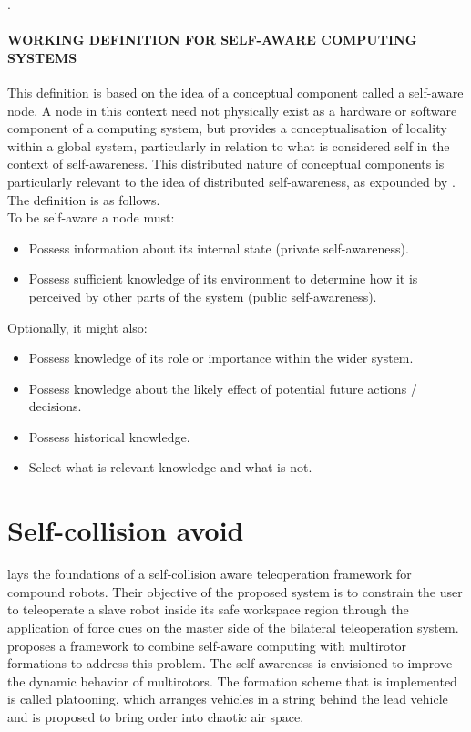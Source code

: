 \documentclass{article}
\begin{document}
		
		\citet{mitchell-2005-self-awareness-and-control-in-decentralized-systems}.
		
		\paragraph{WORKING DEFINITION FOR SELF-AWARE COMPUTING SYSTEMS}
		This definition is based on the idea of a conceptual component called a self-aware node. A node in this context need not physically exist as a hardware or software component of a computing system, but provides a conceptualisation of locality within a global system, particularly in relation to what is considered self in the context of self-awareness. This distributed nature of conceptual components is particularly relevant to the idea of distributed self-awareness, as expounded by \citet{mitchell-2005-self-awareness-and-control-in-decentralized-systems}. The definition is as follows.
		\\
		To be self-aware a node must:
		\begin{itemize}
			\item Possess information about its internal state
			(private self-awareness).
			\item Possess sufficient knowledge of its environment to determine how it is perceived by other
			parts of the system (public self-awareness).
		\end{itemize}
		Optionally, it might also:
		\begin{itemize}
			\item Possess knowledge of its role or importance
			within the wider system.
			\item Possess knowledge about the likely effect of
			potential future actions / decisions.
			\item Possess historical knowledge.
			\item Select what is relevant knowledge and what is
			not.
		\end{itemize}
	\section{Self-collision avoid}
	\cite{selvaggio-2017-towards-a-self-collision-aware-teleoperation-framework-for-compound-robots} lays the foundations of a self-collision aware teleoperation framework for compound robots. Their objective of the proposed system is to constrain the user to teleoperate a slave robot inside its safe workspace region through the application of force cues on the master side of the bilateral teleoperation system.
	\cite{kaiser-2020-towards-self-aware-multirotor-formations} proposes a framework to combine self-aware computing with multirotor formations to address this problem. The self-awareness is envisioned to improve the
	dynamic behavior of multirotors. The formation scheme that is implemented is called platooning,
	which arranges vehicles in a string behind the lead vehicle and is proposed to bring order into chaotic
	air space.
\end{document}
